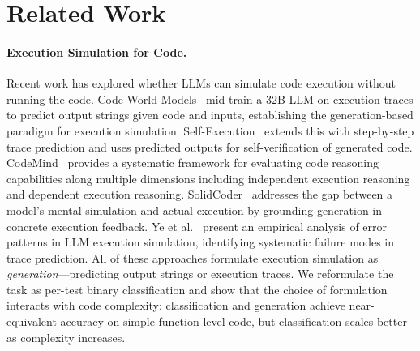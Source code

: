 \section{Related Work}
\label{sec:related_work}

\paragraph{Execution Simulation for Code.}
Recent work has explored whether LLMs can simulate code execution without running the code.
Code World Models~\cite{meta2025cwm} mid-train a 32B LLM on execution traces to predict output strings given code and inputs, establishing the generation-based paradigm for execution simulation.
Self-Execution~\cite{ding2025selfexecution} extends this with step-by-step trace prediction and uses predicted outputs for self-verification of generated code.
CodeMind~\cite{liu2024codemind} provides a systematic framework for evaluating code reasoning capabilities along multiple dimensions including independent execution reasoning and dependent execution reasoning.
SolidCoder~\cite{chen2025solidcoder} addresses the gap between a model's mental simulation and actual execution by grounding generation in concrete execution feedback.
Ye et al.~\cite{ye2025demystifying} present an empirical analysis of error patterns in LLM execution simulation, identifying systematic failure modes in trace prediction.
All of these approaches formulate execution simulation as \emph{generation}---predicting output strings or execution traces. We reformulate the task as per-test binary classification and show that the choice of formulation interacts with code complexity: classification and generation achieve near-equivalent accuracy on simple function-level code, but classification scales better as complexity increases.

